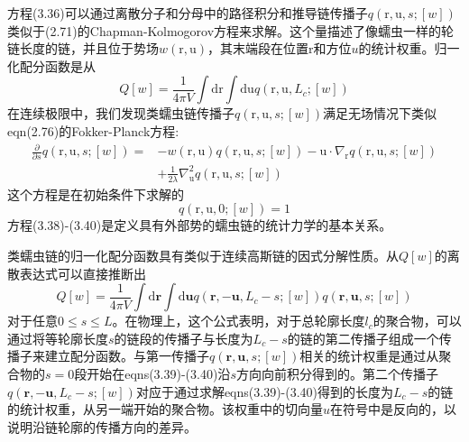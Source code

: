 方程(3.36)可以通过离散分子和分母中的路径积分和推导链传播子$q(\mathrm{r},\mathrm{u},s;[w])$类似于(2.71)的Chapman-Kolmogorov方程来求解。这个量描述了像蠕虫一样的轮链长度的链，并且位于势场$w(\mathrm{r},\mathrm{u})$，其末端段在位置$\mathrm{r}$和方位$u$的统计权重。归一化配分函数是从
\begin{equation}
Q[w]=\frac{1}{4\pi V}\int\mathrm{d}\mathrm{r}\int\mathrm{d}\mathrm{u}q(\mathrm{r},\mathrm{u},L_c;[w])
\end{equation}
在连续极限中，我们发现类蠕虫链传播子$q(\mathrm{r},\mathrm{u},s;[w])$满足无场情况下类似eqn(2.76)的Fokker-Planck方程:
\begin{equation}
\begin{aligned}
\frac{\partial}{\partial s}q(\mathrm{r},\mathrm{u},s;[w])=&-w(\mathrm{r},\mathrm{u})q(\mathrm{r},\mathrm{u},s;[w])-\mathrm{u}\cdot\nabla_{\mathrm{r}}q(\mathrm{r},\mathrm{u},s;[w])\\
&+\frac{1}{2\lambda}\nabla_{\mathrm{u}}^2q(\mathrm{r},\mathrm{u},s;[w])
\end{aligned}
\end{equation}
这个方程是在初始条件下求解的
\begin{equation}
q(\mathrm{r},\mathrm{u},0;[w])=1
\end{equation}
方程(3.38)-(3.40)是定义具有外部势的蠕虫链的统计力学的基本关系。

类蠕虫链的归一化配分函数具有类似于连续高斯链的因式分解性质。从$Q[w]$的离散表达式可以直接推断出
\begin{equation}
Q[w]=\frac{1}{4\pi V}\int\mathrm{d}\mathbf{r}\int\mathrm{d}\mathbf{u}q(\mathbf{r},-\mathbf{u},L_c-s;[w])q(\mathbf{r},\mathbf{u},s;[w])
\end{equation}
对于任意$0\le s\le L$。在物理上，这个公式表明，对于总轮廓长度$l_c$的聚合物，可以通过将等轮廓长度$s$的链段的传播子与长度为$L_c-s$的链的第二传播子组成一个传播子来建立配分函数。与第一传播子$q(\mathbf{r},\mathbf{u},s;[w])$相关的统计权重是通过从聚合物的$s=0$段开始在eqns(3.39)-(3.40)沿$s$方向向前积分得到的。第二个传播子$q(\mathbf{r},-\mathbf{u},L_c-s;[w])$对应于通过求解eqns(3.39)-(3.40)得到的长度为$L_c-s$的链的统计权重，从另一端开始的聚合物。该权重中的切向量$u$在符号中是反向的，以说明沿链轮廓的传播方向的差异。


